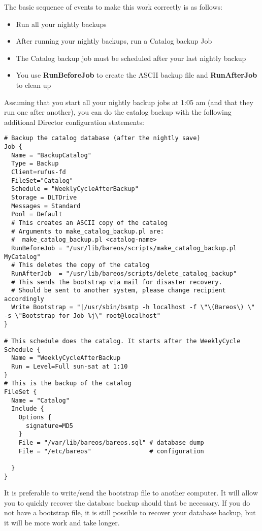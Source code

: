The basic sequence of events to make this work correctly is as follows:

\begin{itemize}
\item Run all your nightly backups
\item After running your nightly backups, run a Catalog backup Job
\item The Catalog backup job must be scheduled after your last nightly backup

\item You use {\bf RunBeforeJob} to create the ASCII  backup file and {\bf
   RunAfterJob} to clean up
\end{itemize}

Assuming that you start all your nightly backup jobs at 1:05 am (and that they
run one after another), you can do the catalog backup with the following
additional Director configuration statements:

\footnotesize
\begin{verbatim}
# Backup the catalog database (after the nightly save)
Job {
  Name = "BackupCatalog"
  Type = Backup
  Client=rufus-fd
  FileSet="Catalog"
  Schedule = "WeeklyCycleAfterBackup"
  Storage = DLTDrive
  Messages = Standard
  Pool = Default
  # This creates an ASCII copy of the catalog
  # Arguments to make_catalog_backup.pl are:
  #  make_catalog_backup.pl <catalog-name>
  RunBeforeJob = "/usr/lib/bareos/scripts/make_catalog_backup.pl MyCatalog"
  # This deletes the copy of the catalog
  RunAfterJob  = "/usr/lib/bareos/scripts/delete_catalog_backup"
  # This sends the bootstrap via mail for disaster recovery.
  # Should be sent to another system, please change recipient accordingly
  Write Bootstrap = "|/usr/sbin/bsmtp -h localhost -f \"\(Bareos\) \" -s \"Bootstrap for Job %j\" root@localhost"
}

# This schedule does the catalog. It starts after the WeeklyCycle
Schedule {
  Name = "WeeklyCycleAfterBackup
  Run = Level=Full sun-sat at 1:10
}
# This is the backup of the catalog
FileSet {
  Name = "Catalog"
  Include {
    Options {
      signature=MD5
    }
    File = "/var/lib/bareos/bareos.sql" # database dump
    File = "/etc/bareos"                # configuration

  }
}
\end{verbatim}
\normalsize

It is preferable
to write/send the bootstrap file to another computer. It will allow
you to quickly recover the database backup should that be necessary.  If
you do not have a bootstrap file, it is still possible to recover your
database backup, but it will be more work and take longer.


